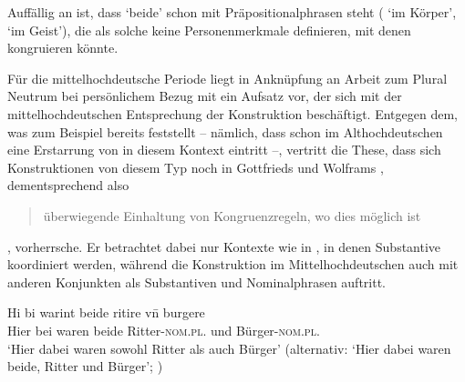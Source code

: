 Auffällig an  ist, dass  `beide' schon mit
Präpositionalphrasen steht ( `im Körper',  `im Geist'), die als solche keine Personenmerkmale definieren, mit denen
 kongruieren könnte.

\begin{exe}
\end{exe}

Für die mittelhochdeutsche Periode liegt in Anknüpfung an
 Arbeit zum Plural Neutrum bei persönlichem Bezug mit
\citet{askedal1974} ein Aufsatz vor, der sich mit der
mittelhochdeutschen Entsprechung der Konstruktion
 beschäftigt. Entgegen dem, was zum Beispiel bereits
\citet[433--434]{behaghel1923} feststellt -- nämlich, dass schon im
Althochdeutschen eine Erstarrung von  in diesem
Kontext eintritt --, vertritt \citeauthor{askedal1974} die These, dass sich
Konstruktionen von diesem Typ noch in Gottfrieds
\nocite{maroldschroeder1969} und Wolframs
\nocite{lachmannhartl1952} ,
dementsprechend also \blockcquote[37]{askedal1974}{überwiegende Einhaltung von
Kongruenzregeln, wo dies möglich ist}, vorherrsche. Er betrachtet dabei nur
Kontexte wie in , in denen Substantive koordiniert
werden, während die Konstruktion im Mittelhochdeutschen
auch mit anderen Konjunkten als Substantiven und Nominalphrasen auftritt.

\begin{exe}
\ex\label{ex:mhdbeideunde2}
	\gll Hi bi warint beide ritire vn̄ burgere \\
		Hier bei waren beide Ritter-\textsc{nom.pl.\MascM} und
			Bürger-\textsc{nom.pl.\MascA} \\
	\trans %
		`Hier dabei waren sowohl Ritter als auch Bürger' (alternativ: `Hier
		dabei waren beide, Ritter und Bürger'; \cites(Nr.~N~321, Rosheim,
		Dépt.~Bas-Rhin, 1286)[245,29]{cao5})
\end{exe}


